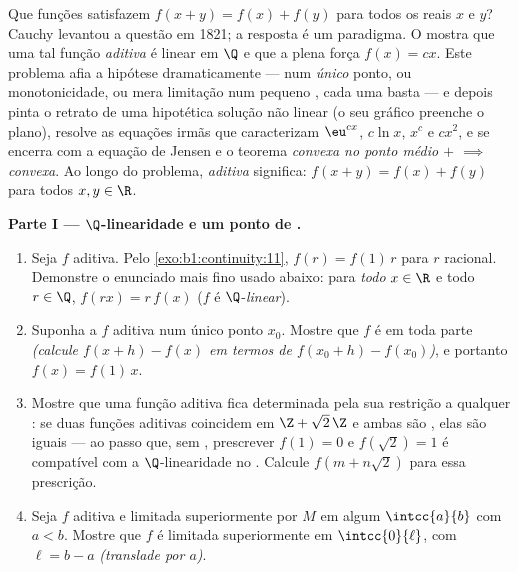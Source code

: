 \begin{problem}[{Problema de fim de semana --- $f(x + y) = f(x) + f(y)$:
a regularidade força a linearidade, e o retrato dos monstros}]
\label{pb:b1:continuity:1}
Que funções satisfazem $f(x + y) = f(x) + f(y)$ para todos os reais $x$ e
$y$? Cauchy levantou a questão em 1821; a resposta é um paradigma.
O  mostra que uma tal função \emph{aditiva}
é linear em $\Q$ e que a  plena força $f(x)
= cx$. Este problema afia a hipótese dramaticamente ---
 num \emph{único} ponto, ou monotonicidade, ou mera
limitação num pequeno , cada uma basta --- e depois pinta
o retrato de uma hipotética solução não linear (o seu gráfico
preenche o plano), resolve as equações irmãs que caracterizam
$\eu^{cx}$, $c\ln x$, $x^c$ e $cx^2$, e se encerra com a equação de Jensen
e o teorema \emph{convexa no ponto médio $+$ 
$\implies$ convexa}. Ao longo do problema, \emph{aditiva}
significa: $f(x + y) = f(x) + f(y)$ para todos $x, y \in \R$.

\medskip
\noindent\textbf{Parte I --- $\Q$-linearidade e um ponto de
.}
\begin{enumerate}
  \item Seja $f$ aditiva. Pelo \cref{exo:b1:continuity:11},
        $f(r) = f(1)\,r$ para $r$ racional. Demonstre o enunciado mais
        fino usado abaixo: para \emph{todo} $x \in \R$ e todo $r
        \in \Q$, $f(rx) = r\,f(x)$ ($f$ é
        $\Q$-\emph{linear}).
  \item Suponha a $f$ aditiva  num único
        ponto $x_0$. Mostre que $f$ é  em toda parte
        \emph{(calcule $f(x + h) - f(x)$ em termos de $f(x_0 + h)
        - f(x_0)$)}, e portanto $f(x) = f(1)\,x$.
  \item Mostre que uma função aditiva fica determinada pela sua
        restrição a qualquer  : se duas funções aditivas
        coincidem em $\Z + \sqrt2\,\Z$ e ambas são
        , elas são iguais --- ao passo que, sem ,
        prescrever $f(1) = 0$ e $f(\sqrt 2) = 1$ é compatível
        com a $\Q$-linearidade no . Calcule $f(m +
        n\sqrt2)$
        para essa prescrição.
  \item Seja $f$ aditiva e limitada superiormente por $M$ em algum
         $\intcc{a}{b}$ com $a < b$. Mostre que $f$ é
        limitada superiormente em $\intcc{0}{\ell}$, com $\ell = b - a$
        \emph{(translade por $a$)}.
\end{enumerate}


\end{problem}
